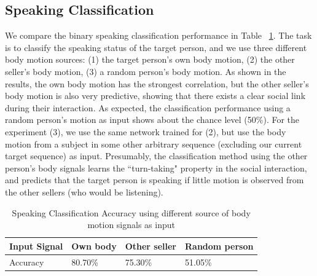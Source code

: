 \subsection{Speaking Classification}
We compare the binary speaking classification performance in Table ~\ref{table:speaking_class}. The task is to classify the speaking status of the target person, and we use three different body motion sources: (1) the target person's own body motion, (2) the other seller's body motion, (3) a random person's body motion. As shown in the results, the own body motion has the strongest correlation, but the other seller's body motion is also very predictive, showing that there exists a clear social link during their interaction. As expected, the classification performance using a random person's motion as input shows about the chance level (50\%). For the experiment (3), we use the same network trained for (2), but use the body motion from a subject in some other arbitrary sequence (excluding our current target sequence) as input. Presumably, the classification method using the other person's body signals learns the ``turn-taking" property in the social interaction, and predicts that the target person is speaking if little motion is observed from the other sellers (who would be listening). %
\begin{table}[t]
	\centering
	\begin{tabular}{l| l| l| l}
		\hline
		Input Signal & Own body & Other seller & Random person\\
		\hline
		Accuracy & 80.70\% & 75.30\% & 51.05\%\\       %
		\hline
	\end{tabular}
	\caption{Speaking Classification Accuracy using different source of body motion signals as input\label{table:speaking_class}}
\end{table}


